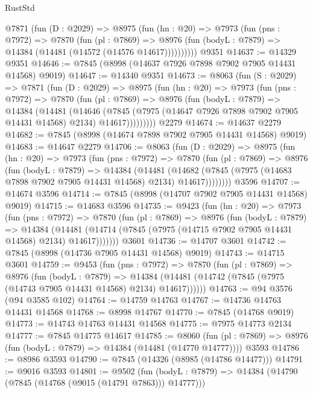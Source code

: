 \begin{lexlean}{RustStd}
\begin{coremodule}
      @7871
        (fun (D : @2029) =>
        @8975
          (fun (hn : @20) =>
          @7973
            (fun (pns : @7972) =>
            @7870
              (fun (pl : @7869) =>
              @8976 (fun (bodyL : @7879) => @14384 (@14481 (@14572 (@14576 @14617))))))))))
    @9351
@14637 := @14329 @9351
@14646 := @7845 (@8998 (@14637 @7926 @7898 @7902 @7905 @14431 @14568) @9019)
@14647 := @14340 @9351
@14673 := @8063
    (fun (S : @2029) =>
    @7871
      (fun (D : @2029) =>
      @8975
        (fun (hn : @20) =>
        @7973
          (fun (pns : @7972) =>
          @7870
            (fun (pl : @7869) =>
            @8976
              (fun (bodyL : @7879) =>
              @14384
                (@14481
                  (@14646
                    (@7845
                      (@7975 (@14647 @7926 @7898 @7902 @7905 @14431 @14568) @2134)
                      @14617)))))))))
    @2279
@14674 := @14637 @2279
@14682 := @7845 (@8998 (@14674 @7898 @7902 @7905 @14431 @14568) @9019)
@14683 := @14647 @2279
@14706 := @8063
    (fun (D : @2029) =>
    @8975
      (fun (hn : @20) =>
      @7973
        (fun (pns : @7972) =>
        @7870
          (fun (pl : @7869) =>
          @8976
            (fun (bodyL : @7879) =>
            @14384
              (@14481
                (@14682 (@7845 (@7975 (@14683 @7898 @7902 @7905 @14431 @14568) @2134) @14617))))))))
    @3596
@14707 := @14674 @3596
@14714 := @7845 (@8998 (@14707 @7902 @7905 @14431 @14568) @9019)
@14715 := @14683 @3596
@14735 := @9423
    (fun (hn : @20) =>
    @7973
      (fun (pns : @7972) =>
      @7870
        (fun (pl : @7869) =>
        @8976
          (fun (bodyL : @7879) =>
          @14384
            (@14481 (@14714 (@7845 (@7975 (@14715 @7902 @7905 @14431 @14568) @2134) @14617)))))))
    @3601
@14736 := @14707 @3601
@14742 := @7845 (@8998 (@14736 @7905 @14431 @14568) @9019)
@14743 := @14715 @3601
@14759 := @9453
    (fun (pns : @7972) =>
    @7870
      (fun (pl : @7869) =>
      @8976
        (fun (bodyL : @7879) =>
        @14384 (@14481 (@14742 (@7845 (@7975 (@14743 @7905 @14431 @14568) @2134) @14617))))))
@14763 := @94 @3576 (@94 @3585 @102)
@14764 := @14759 @14763
@14767 := @14736 @14763 @14431 @14568
@14768 := @8998 @14767
@14770 := @7845 (@14768 @9019)
@14773 := @14743 @14763 @14431 @14568
@14775 := @7975 @14773 @2134
@14777 := @7845 @14775 @14617
@14785 := @8060
    (fun (pl : @7869) => @8976 (fun (bodyL : @7879) => @14384 (@14481 (@14770 @14777))))
    @3593
@14786 := @8986 @3593
@14790 := @7845 (@14326 (@8985 (@14786 @14477)))
@14791 := @9016 @3593
@14801 := @9502
    (fun (bodyL : @7879) => @14384 (@14790 (@7845 (@14768 (@9015 (@14791 @7863))) @14777)))

\end{coremodule}
\end{lexlean}
